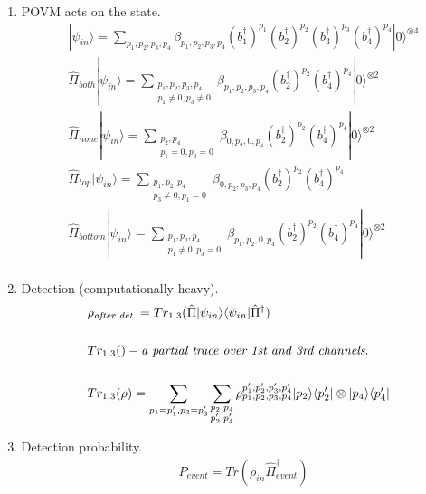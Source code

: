 \documentclass[12pt]{article}
\begin{document}
\begin{enumerate}
\item POVM acts on the state.
\begin{align*}
& |\psi_{in}\rangle = \sum_{p_{1},p_{2},p_{3},p_{4}} \beta_{p_{1},p_{2},p_{3},p_{4}} (b_{1}^{\dag})^{p_{1}}  (b_{2}^{\dag})^{p_{2}} (b_{3}^{\dag})^{p_{3}}  (b_{4}^{\dag})^{p_{4}} |0\rangle^{\otimes 4} \\
& \hat{\Pi}_{both} |\psi_{in}\rangle = \sum_{\substack{p_{1},p_{2},p_{3},p_{4} \\ p_{1} \neq 0, p_{3} \neq 0}} \beta_{p_{1},p_{2},p_{3},p_{4}} (b_{2}^{\dag})^{p_{2}} (b_{4}^{\dag})^{p_{4}} |0\rangle^{\otimes 2}  \\
& \hat{\Pi}_{none} |\psi_{in}\rangle = \sum_{\substack{p_{2},p_{4} \\ p_{1}=0, p_{3}=0}} \beta_{0,p_{2},0,p_{4}} (b_{2}^{\dag})^{p_{2}} (b_{4}^{\dag})^{p_{4}} |0\rangle^{\otimes 2}  \\
& \hat{\Pi}_{top} |\psi_{in}\rangle = \sum_{\substack{p_{1},p_{2},p_{4} \\ p_{3} \neq 0, p_{1}=0}} \beta_{0,p_{2},p_{3},p_{4}} (b_{2}^{\dag})^{p_{2}} (b_{4}^{\dag})^{p_{4}} \\ 
& \hat{\Pi}_{bottom} |\psi_{in}\rangle = \sum_{\substack{p_{1},p_{2},p_{4} \\ p_{1} \neq 0, p_{3}=0}} \beta_{p_{1},p_{2},0,p_{4}} (b_{2}^{\dag})^{p_{2}} (b_{4}^{\dag})^{p_{4}}  |0\rangle^{\otimes 2}  \\
\end{align*}

\item Detection (computationally heavy).
\begin{align*}
& \rho_{\text{\textit{after det.}}} =  Tr_{1,3}(\hat{\Pi} |\psi_{in}\rangle \langle \psi_{in}|   \hat{\Pi}^{\dag}) \\
\\
& Tr_{1,3}() - \textit{a partial trace over 1st and 3rd channels}. \\
\\
& Tr_{1,3}(\rho) = \sum_{p_{1} = p'_{1}, p_{3} = p'_{3}} \sum_{\substack{p_{2},p_{4} \\ p'_{2}, p'_{4}}} \rho_{p_{1},p_{2},p_{3},p_{4}}^{p'_{1},p'_{2},p'_{3},p'_{4}} |p_{2}\rangle \langle p'_{2}| \otimes |p_{4}\rangle \langle p'_{4}|
\end{align*}

\item Detection probability.
\begin{align*}
& P_{event} =  Tr(  \rho_{in}  \hat{\Pi}^{\dag}_{event})
\end{align*}



\end{enumerate}
\end{document}
